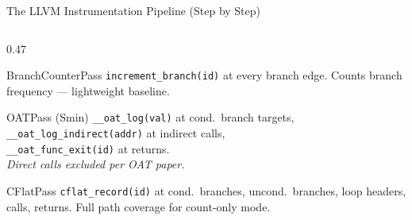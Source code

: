 \documentclass[aspectratio=169, 10pt]{beamer}
\begin{document}
\begin{frame}[fragile]{The LLVM Instrumentation Pipeline (Step by Step)}
\begin{columns}[T]
\begin{column}{0.47\textwidth}
            \begin{defbox}{BranchCounterPass}
                \scriptsize \texttt{increment\_branch(id)} at every branch edge.
                Counts branch frequency --- lightweight baseline.
            \end{defbox}
            \vspace{2pt}
            \begin{warnbox}{OATPass (Smin)}
                \scriptsize \texttt{\_\_oat\_log(val)} at cond.\ branch targets,\\
                \texttt{\_\_oat\_log\_indirect(addr)} at indirect calls,\\
                \texttt{\_\_oat\_func\_exit(id)} at returns.\\
                \textit{Direct calls excluded per OAT paper.}
            \end{warnbox}
            \vspace{2pt}
            \begin{greenbox}{CFlatPass}
                \scriptsize \texttt{cflat\_record(id)} at cond.\ branches, uncond.\
                branches, loop headers, calls, returns.
                Full path coverage for count-only mode.
            \end{greenbox}
        \end{column}
    \end{columns}
\end{frame}
\end{document}
